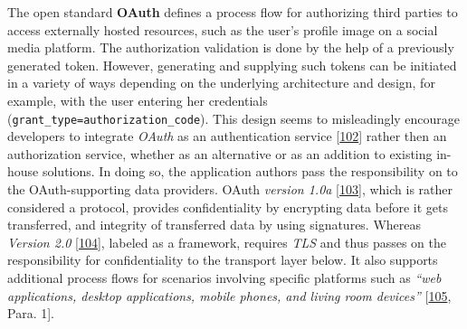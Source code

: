 \documentclass[12pt,english,a4paper,titlepage,cleardoublepage=empty,dottedtoc]{report}
\begin{document}
The open standard \textbf{\protect\hypertarget{def--oauth}{}{OAuth}}
defines a process flow for authorizing third parties to access
externally hosted resources, such as the user's profile image on a
social media platform. The authorization validation is done by the help
of a previously generated token. However, generating and supplying such
tokens can be initiated in a variety of ways depending on the underlying
architecture and design, for example, with the user entering her
credentials (\texttt{grant\_type=authorization\_code}). This design
seems to misleadingly encourage developers to integrate \emph{OAuth} as
an authentication service
{[}\protect\hyperlink{ref-web_2012_problem-with-oauth-for-authentication}{102}{]}
rather then an authorization service, whether as an alternative or as an
addition to existing in-house solutions. In doing so, the application
authors pass the responsibility on to the OAuth-supporting data
providers. OAuth \emph{version 1.0a}
{[}\protect\hyperlink{ref-web_spec_oauth-1a}{103}{]}, which is rather
considered a protocol, provides confidentiality by encrypting data
before it gets transferred, and integrity of transferred data by using
signatures. Whereas \emph{Version 2.0}
{[}\protect\hyperlink{ref-web_spec_oauth-2}{104}{]}, labeled as a
framework, requires \emph{TLS} and thus passes on the responsibility for
confidentiality to the transport layer below. It also supports
additional process flows for scenarios involving specific platforms such
as \emph{``web applications, desktop applications, mobile phones, and
living room devices''} {[}\protect\hyperlink{ref-web_2016_oauth-2}{105},
Para. 1{]}.
\end{document}
